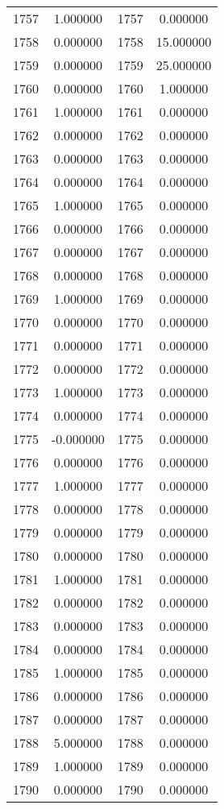 \documentclass[12pt]{article}
\begin{document}
\begin{longtable}{@{}cccc@{}}
1757 & 1.000000 & 1757 & 0.000000 \\
1758 & 0.000000 & 1758 & 15.000000 \\
1759 & 0.000000 & 1759 & 25.000000 \\
1760 & 0.000000 & 1760 & 1.000000 \\
1761 & 1.000000 & 1761 & 0.000000 \\
1762 & 0.000000 & 1762 & 0.000000 \\
1763 & 0.000000 & 1763 & 0.000000 \\
1764 & 0.000000 & 1764 & 0.000000 \\
1765 & 1.000000 & 1765 & 0.000000 \\
1766 & 0.000000 & 1766 & 0.000000 \\
1767 & 0.000000 & 1767 & 0.000000 \\
1768 & 0.000000 & 1768 & 0.000000 \\
1769 & 1.000000 & 1769 & 0.000000 \\
1770 & 0.000000 & 1770 & 0.000000 \\
1771 & 0.000000 & 1771 & 0.000000 \\
1772 & 0.000000 & 1772 & 0.000000 \\
1773 & 1.000000 & 1773 & 0.000000 \\
1774 & 0.000000 & 1774 & 0.000000 \\
1775 & -0.000000 & 1775 & 0.000000 \\
1776 & 0.000000 & 1776 & 0.000000 \\
1777 & 1.000000 & 1777 & 0.000000 \\
1778 & 0.000000 & 1778 & 0.000000 \\
1779 & 0.000000 & 1779 & 0.000000 \\
1780 & 0.000000 & 1780 & 0.000000 \\
1781 & 1.000000 & 1781 & 0.000000 \\
1782 & 0.000000 & 1782 & 0.000000 \\
1783 & 0.000000 & 1783 & 0.000000 \\
1784 & 0.000000 & 1784 & 0.000000 \\
1785 & 1.000000 & 1785 & 0.000000 \\
1786 & 0.000000 & 1786 & 0.000000 \\
1787 & 0.000000 & 1787 & 0.000000 \\
1788 & 5.000000 & 1788 & 0.000000 \\
1789 & 1.000000 & 1789 & 0.000000 \\
1790 & 0.000000 & 1790 & 0.000000 \\

\end{longtable}
\end{document}
